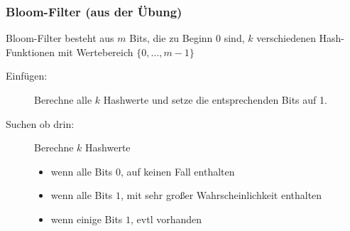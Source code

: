 \documentclass{scrartcl}
\begin{document}

\subsubsection{Bloom-Filter {\tiny (aus der Übung)}}
Bloom-Filter besteht aus $m$ Bits, die zu Beginn 0 sind, $k$ verschiedenen Hash-Funktionen mit Wertebereich $\{0,\ldots,m-1\}$ \\
\begin{description}
	\item[Einfügen:] Berechne alle $k$ Hashwerte und setze die entsprechenden Bits auf 1.
	\item[Suchen ob drin:] Berechne $k$ Hashwerte
	\begin{itemize}
		\item wenn alle Bits $0$, auf keinen Fall enthalten
		\item wenn alle Bits $1$, mit sehr großer Wahrscheinlichkeit enthalten
		\item wenn einige Bits $1$, evtl vorhanden
	\end{itemize}

\end{description}

\end{document}
